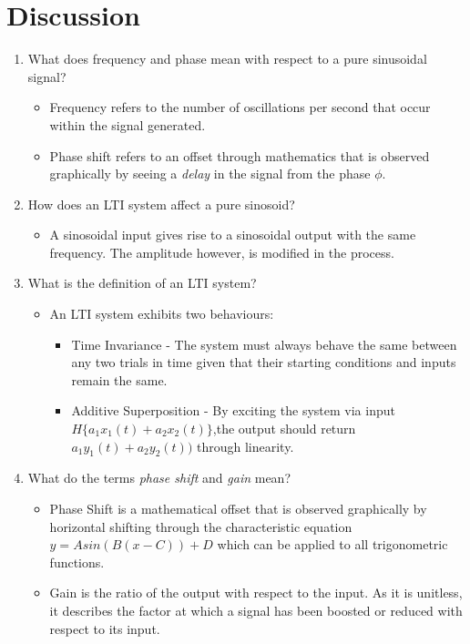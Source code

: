 \documentclass[12pt]{article}
\begin{document}
\section{Discussion}
\begin{enumerate}
\item What does frequency and phase mean with respect to a pure sinusoidal signal?
\begin{itemize}
\item Frequency refers to the number of oscillations per second that occur within the signal generated.
\item Phase shift refers to an offset through mathematics that is observed graphically by seeing a \emph{delay} in the signal from the phase $\phi$.
\end{itemize}
\item How does an LTI system affect a pure sinosoid?
\begin{itemize}
\item A sinosoidal input gives rise to a sinosoidal output with the same frequency. The amplitude however, is modified in the process.
\end{itemize}
\item What is the definition of an LTI system?
\begin{itemize}
\item An LTI system exhibits two behaviours:
\begin{itemize}
\item Time Invariance - The system must always behave the same between any two trials in time given that their starting conditions and inputs remain the same.
\item Additive Superposition - By exciting the system via input $H\{a_1x_1(t)+a_2x_2(t)\}$,the output should return $a_1y_1(t)+a_2y_2(t))$ through linearity.
\end{itemize}
\end{itemize}
\item What do the terms \emph{phase shift} and \emph{gain} mean?
\begin{itemize}
\item Phase Shift is a mathematical offset that is observed graphically by horizontal shifting through the characteristic equation $y=Asin(B(x-C))+D$ which can be applied to all trigonometric functions.
\item Gain is the ratio of the output with respect to the input. As it is unitless, it describes the factor at which a signal has been boosted or reduced with respect to its input.
\end{itemize}

\end{enumerate}
\end{document}
